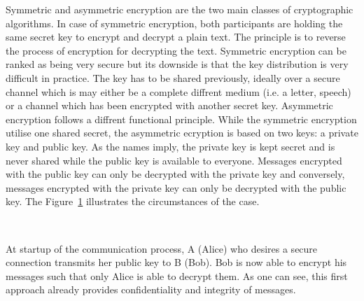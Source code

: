 Symmetric and asymmetric encryption are the two main classes of cryptographic algorithms.
In case of symmetric encryption, both participants are holding the same secret key to encrypt and decrypt a plain text.
The principle is to reverse the process of encryption for decrypting the text.
Symmetric encryption can be ranked as being very secure but its downside is that the key distribution is very difficult in practice.
The key has to be shared previously, ideally over a secure channel which is may either be a complete diffrent medium (i.e. a letter, speech) or a channel which has been encrypted with another secret key.
Asymmetric encryption follows a diffrent functional principle.
While the symmetric encryption utilise one shared secret, the asymmetric ecryption is based on two keys: a private key and public key.
As the names imply, the private key is kept secret and is never shared while the public key is available to everyone.
Messages encrypted with the public key can only be decrypted with the private key and conversely, messages encrypted with the private key can only be decrypted with the public key. 
The Figure~\ref{fig:asymmetric_encryption} illustrates the circumstances of the case.
\begin{figure}[htb]
	\centering%
	\\
	\label{fig:asymmetric_encryption}
\end{figure}

At startup of the communication process, A (Alice) who desires a secure connection transmits her public key to B (Bob).
Bob is now able to encrypt his messages such that only Alice is able to decrypt them.
As one can see, this first approach already provides confidentiality and integrity of messages.

